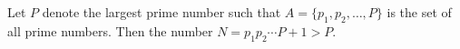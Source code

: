 Let $P$ denote the largest prime number such that $A = \{p_{1}, p_{2}, \ldots, P\}$ is the set of all prime numbers.
Then the number $N = p_{1} p_{2} \cdots P + 1 > P$.